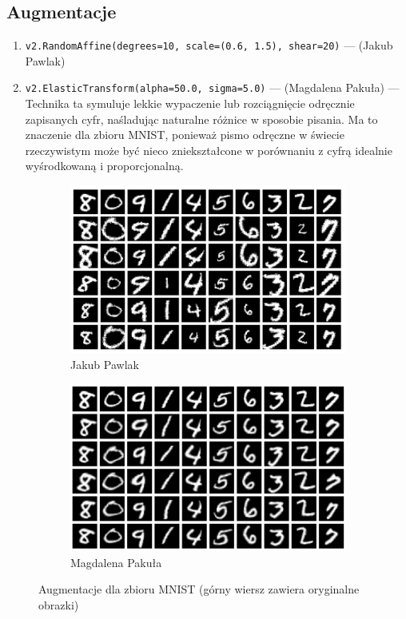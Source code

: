 \documentclass[10pt]{article}
\begin{document}
\subsection*{Augmentacje}
\begin{enumerate}
    \item \texttt{v2.RandomAffine(degrees=10, scale=(0.6, 1.5), shear=20)} --- (Jakub Pawlak)
    \item \texttt{v2.ElasticTransform(alpha=50.0, sigma=5.0)} --- (Magdalena Pakuła) --- \\
          Technika ta symuluje lekkie wypaczenie lub rozciągnięcie odręcznie zapisanych cyfr, naśladując naturalne różnice w sposobie pisania.
          Ma to znaczenie dla zbioru MNIST, ponieważ pismo odręczne w świecie rzeczywistym może być nieco zniekształcone w porównaniu z cyfrą idealnie wyśrodkowaną i proporcjonalną.
\end{enumerate}

\begin{figure}[H]\centering
    \begin{subfigure}[t]{.45\textwidth}
        \centering
        \includegraphics[width=.7\linewidth]{img/kuba/mnist/augmentations.png}
        \caption{Jakub Pawlak}
    \end{subfigure}
    \begin{subfigure}[t]{.45\textwidth}
        \centering
        \includegraphics[width=0.7\linewidth]{img/magda/augmented_MNIST}
        \caption{Magdalena Pakuła}
    \end{subfigure}
    \caption{Augmentacje dla zbioru MNIST (górny wiersz zawiera oryginalne obrazki)}
\end{figure}
\end{document}
